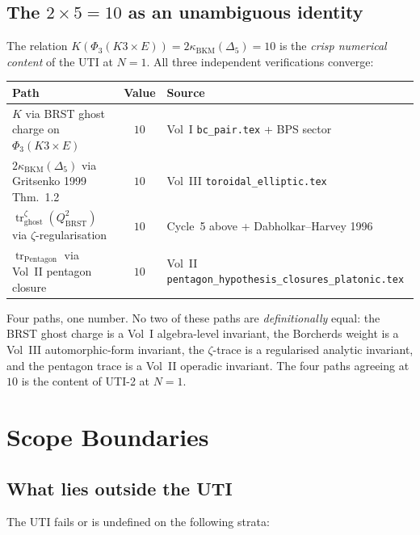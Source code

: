 \documentclass[11pt]{article}
\theoremstyle{definition}
\newcommand{\kBKM}{\kappa_{\mathrm{BKM}}}
\newcommand{\BRST}{\mathrm{BRST}}
\newcommand{\tr}{\operatorname{tr}}
\begin{document}
\subsection{The $2 \times 5 = 10$ as an unambiguous identity}

The relation $K(\Phi_3(K3 \times E)) = 2 \kBKM(\Delta_5) = 10$ is the
\emph{crisp numerical content} of the UTI at $N = 1$. All three
independent verifications converge:

\begin{center}
\begin{tabular}{l|c|l}
Path & Value & Source \\ \hline
$K$ via BRST ghost charge on $\Phi_3(K3 \times E)$
  & $10$ & Vol~I \texttt{bc\_pair.tex} + BPS sector \\
$2 \kBKM(\Delta_5)$ via Gritsenko 1999 Thm.~1.2
  & $10$ & Vol~III \texttt{toroidal\_elliptic.tex} \\
$\tr^{\zeta}_{\mathrm{ghost}}(Q_{\BRST}^2)$ via $\zeta$-regularisation
  & $10$ & Cycle~5 above + Dabholkar--Harvey 1996 \\
$\tr_{\mathrm{Pentagon}}$ via Vol~II pentagon closure
  & $10$ & Vol~II \texttt{pentagon\_hypothesis\_closures\_platonic.tex}
\end{tabular}
\end{center}

Four paths, one number. No two of these paths are \emph{definitionally}
equal: the BRST ghost charge is a Vol~I algebra-level invariant, the
Borcherds weight is a Vol~III automorphic-form invariant, the
$\zeta$-trace is a regularised analytic invariant, and the pentagon
trace is a Vol~II operadic invariant. The four paths agreeing at $10$
is the content of UTI-2 at $N = 1$.

\section{Scope Boundaries}
\label{sec:scope}

\subsection{What lies outside the UTI}

The UTI fails or is undefined on the following strata:
\end{document}
